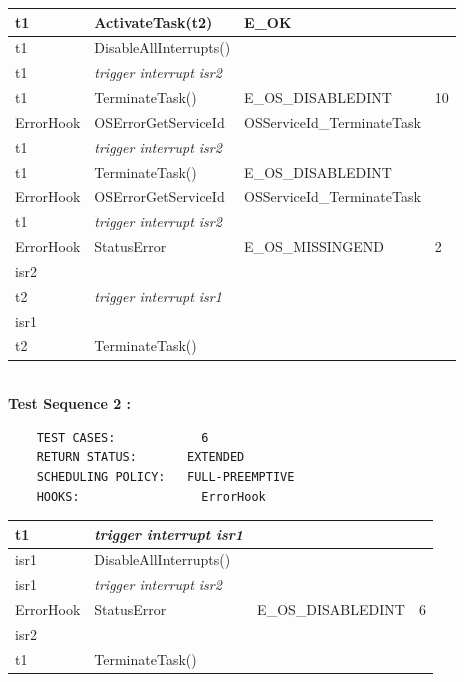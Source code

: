 \documentclass[10pt]{article}
\newlength{\Li}\settowidth{\Li}{Running}
\newlength{\Lii}\setlength{\Lii}{7cm}
\newlength{\Liiii}\setlength{\Liiii}{0.9cm}
\newlength{\Liii}\setlength{\Liii}{\textwidth} \addtolength{\Liii}{-\Li} \addtolength{\Liii}{-\Lii} \addtolength{\Liii}{-\Liiii}
\begin{document}
	\begin{supertabular}{|p{\Li}|p{\Lii}|p{\Liii}|p{\Liiii}|} \hline 
	t1		& ActivateTask(t2)							& E\_OK												& \\ \hline
	t1		& DisableAllInterrupts()						&													& \\ \hline
	t1 		& \textit{trigger interrupt isr2}					& 													& \\ \hline 
	t1		& TerminateTask()							& E\_OS\_DISABLEDINT									& 10 \\ \hline
	ErrorHook	& OSErrorGetServiceId						& OSServiceId\_TerminateTask							& \\ \hline
	t1 		& \textit{trigger interrupt isr2}					& 													& \\ \hline 
	t1		& TerminateTask()							& E\_OS\_DISABLEDINT									& \\ \hline
	ErrorHook	& OSErrorGetServiceId						& OSServiceId\_TerminateTask							& \\ \hline
	t1 		& \textit{trigger interrupt isr2}					& 													& \\ \hline 
	ErrorHook	& StatusError 								& E\_OS\_MISSINGEND									& 2 \\ \hline
	isr2		& 										&													& \\ \hline
	t2 		& \textit{trigger interrupt isr1}					& 													& \\ \hline 
	isr1		& 										& 													& \\ \hline
	t2		& TerminateTask()							& 													& \\ \hline
	\end{supertabular}\\

	\textbf{Test Sequence 2 :}
	\begin{lstlisting}
	TEST CASES:		       6
	RETURN STATUS:	  	 EXTENDED
	SCHEDULING POLICY:   FULL-PREEMPTIVE
	HOOKS:		           ErrorHook
	\end{lstlisting}
	

	\begin{supertabular}{|p{\Li}|p{\Lii}|p{\Liii}|p{\Liiii}|} \hline 
	t1 		& \textit{trigger interrupt isr1}					& 													& \\ \hline 
	isr1		& DisableAllInterrupts()						&													& \\ \hline
	isr1 		& \textit{trigger interrupt isr2}					& 													& \\ \hline 
	ErrorHook	& StatusError								& E\_OS\_DISABLEDINT									& 6 \\ \hline
	isr2		& 										&													& \\ \hline
	t1		& TerminateTask()							& 													& \\ \hline
	\end{supertabular}\\
	
\end{document}
